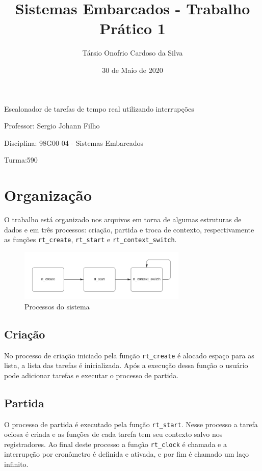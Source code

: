 \documentclass[a4 paper]{article}
\title{Sistemas Embarcados - Trabalho Prático 1}
\author{Társio Onofrio Cardoso da Silva}
\date{30 de Maio de 2020}
\begin{document}
\begin{titlepage}
\maketitle
\begin{center}
    Escalonador de tarefas de tempo real utilizando interrupções
\end{center}
\vfill
\noindent Professor: Sergio Johann Filho

\noindent Disciplina: 98G00-04 - Sistemas Embarcados

\noindent Turma:590

\end{titlepage}


\section{Organização}
O trabalho está organizado nos arquivos em torna de algumas estruturas de dados e em  três processos: criação, partida e troca de contexto, respectivamente as funções \verb|rt_create|, \verb|rt_start| e \verb|rt_context_switch|. 


\begin{figure}[htp]
    \centering
    \includegraphics[width=8cm]{process}
    \caption{Processos do sistema}
    \label{fig:process}
\end{figure}

\subsection{Criação}
No processo de criação iniciado pela função \verb|rt_create| é alocado espaço para as lista, a lista das tarefas é inicializada. Após a execução dessa função o usuário pode adicionar tarefas e executar o processo de partida.

\subsection{Partida}
O processo de partida é executado pela função \verb|rt_start|. Nesse processo a tarefa ociosa é criada e as funções de cada tarefa tem seu contexto salvo nos registradores. Ao final deste processo a função \verb|rt_clock| é chamada e a interrupção por cronômetro é definida e ativada, e por fim é chamado um laço infinito.
\end{document}
